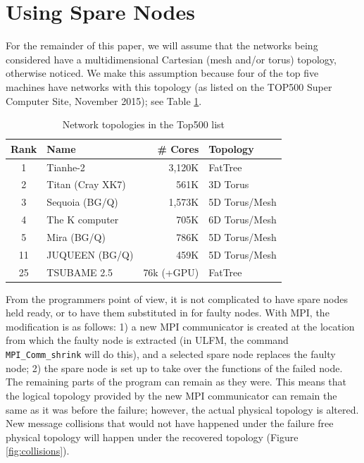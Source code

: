 \documentclass[Afour,times,sagev]{sagej}
\begin{document}
\section{Using Spare Nodes}

For the remainder of this paper, we will assume that the networks
being considered have a multidimensional Cartesian (mesh and/or torus)
topology, otherwise noticed. We make this assumption because four of
the top five machines have networks with this topology (as listed on
the TOP500 Super Computer Site\citep{top500}, November
2015); see Table \ref{tbl:top5-network}. 

\begin{table}[htb]
\centering
\caption{Network topologies in the Top500 list\citep{top500}}
\label{tbl:top5-network}
{\small
\begin{tabular}{c|l|r|l}
\hline
Rank & Name & \# Cores & Topology \\
\hline
\hline
1 & Tianhe-2 & 3,120K & FatTree \\
2 & Titan (Cray XK7) & 561K & 3D Torus \\
3 & Sequoia (BG/Q) & 1,573K & 5D Torus/Mesh \\
4 & The K computer & 705K & 6D Torus/Mesh \\
5 & Mira (BG/Q) & 786K & 5D Torus/Mesh \\
\hline
11 & JUQUEEN (BG/Q) & 459K & 5D Torus/Mesh \\
\hline
25 & TSUBAME 2.5 & 76k (+GPU) & FatTree \\
\hline
\end{tabular}
}
\end{table}

From the programmers point of view, it is not complicated to have
spare nodes held ready, or to have them substituted in for faulty
nodes. With MPI, the modification is as follows: 1) a new MPI
communicator is created at the location from which the faulty node is
extracted (in ULFM, the command {\tt MPI\_Comm\_shrink} will do this),
and a selected spare node replaces the faulty node; 2) the spare node
is set up to take over the functions of the failed node. The remaining
parts of the program can remain as they were. This means that the
logical topology provided by the new MPI communicator can remain the
same as it was before the failure; however, the actual physical
topology is altered. New message collisions that would not
have happened under the failure free physical topology will happen
under the recovered topology (Figure \ref{fig:collisions}).
\end{document}
